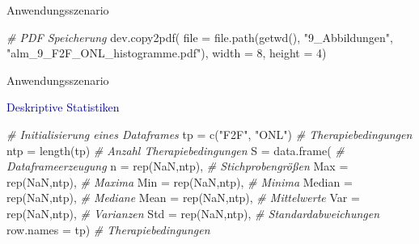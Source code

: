 \documentclass[
  8pt,
  ignorenonframetext,
]{beamer}
\newenvironment{Shaded}{\begin{snugshade}}{\end{snugshade}}
\newcommand{\AttributeTok}[1]{\textcolor[rgb]{0.77,0.63,0.00}{#1}}
\newcommand{\CommentTok}[1]{\textcolor[rgb]{0.56,0.35,0.01}{\textit{#1}}}
\newcommand{\ConstantTok}[1]{\textcolor[rgb]{0.00,0.00,0.00}{#1}}
\newcommand{\DecValTok}[1]{\textcolor[rgb]{0.00,0.00,0.81}{#1}}
\newcommand{\FunctionTok}[1]{\textcolor[rgb]{0.00,0.00,0.00}{#1}}
\newcommand{\NormalTok}[1]{#1}
\newcommand{\OtherTok}[1]{\textcolor[rgb]{0.56,0.35,0.01}{#1}}
\newcommand{\StringTok}[1]{\textcolor[rgb]{0.31,0.60,0.02}{#1}}
\begin{document}
\begin{frame}[fragile]{Anwendungsszenario}
\begin{Shaded}
\begin{Highlighting}[]
\CommentTok{\# PDF Speicherung}
\FunctionTok{dev.copy2pdf}\NormalTok{(}
\AttributeTok{file        =} \FunctionTok{file.path}\NormalTok{(}\FunctionTok{getwd}\NormalTok{(), }\StringTok{"9\_Abbildungen"}\NormalTok{, }\StringTok{"alm\_9\_F2F\_ONL\_histogramme.pdf"}\NormalTok{),}
\AttributeTok{width       =} \DecValTok{8}\NormalTok{,}
\AttributeTok{height      =} \DecValTok{4}\NormalTok{)}
\end{Highlighting}
\end{Shaded}
\end{frame}

\begin{frame}[fragile]{Anwendungsszenario}
\protect\hypertarget{anwendungsszenario-10}{}
\vspace{3mm}
\small

\textcolor{darkblue}{Deskriptive Statistiken}  \tiny
\vspace{1mm}

\begin{Shaded}
\begin{Highlighting}[]
\CommentTok{\# Initialisierung eines Dataframes}
\NormalTok{tp            }\OtherTok{=} \FunctionTok{c}\NormalTok{(}\StringTok{"F2F"}\NormalTok{, }\StringTok{"ONL"}\NormalTok{)                     }\CommentTok{\# Therapiebedingungen}
\NormalTok{ntp           }\OtherTok{=} \FunctionTok{length}\NormalTok{(tp)                          }\CommentTok{\# Anzahl Therapiebedingungen}
\NormalTok{S             }\OtherTok{=} \FunctionTok{data.frame}\NormalTok{(                         }\CommentTok{\# Dataframeerzeugung}
                \AttributeTok{n         =} \FunctionTok{rep}\NormalTok{(}\ConstantTok{NaN}\NormalTok{,ntp),           }\CommentTok{\# Stichprobengrößen}
                \AttributeTok{Max       =} \FunctionTok{rep}\NormalTok{(}\ConstantTok{NaN}\NormalTok{,ntp),           }\CommentTok{\# Maxima}
                \AttributeTok{Min       =} \FunctionTok{rep}\NormalTok{(}\ConstantTok{NaN}\NormalTok{,ntp),           }\CommentTok{\# Minima}
                \AttributeTok{Median    =} \FunctionTok{rep}\NormalTok{(}\ConstantTok{NaN}\NormalTok{,ntp),           }\CommentTok{\# Mediane}
                \AttributeTok{Mean      =} \FunctionTok{rep}\NormalTok{(}\ConstantTok{NaN}\NormalTok{,ntp),           }\CommentTok{\# Mittelwerte}
                \AttributeTok{Var       =} \FunctionTok{rep}\NormalTok{(}\ConstantTok{NaN}\NormalTok{,ntp),           }\CommentTok{\# Varianzen}
                \AttributeTok{Std       =} \FunctionTok{rep}\NormalTok{(}\ConstantTok{NaN}\NormalTok{,ntp),           }\CommentTok{\# Standardabweichungen}
                \AttributeTok{row.names =}\NormalTok{ tp)                     }\CommentTok{\# Therapiebedingungen}


\end{Highlighting}
\end{Shaded}
\end{frame}
\end{document}
